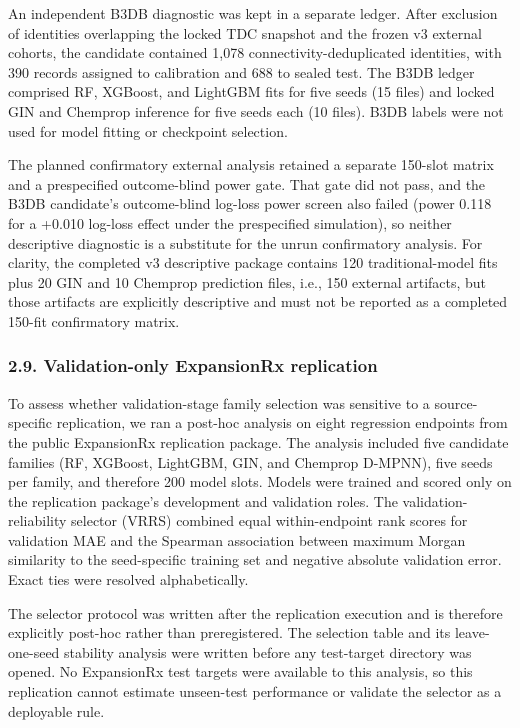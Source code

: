 \documentclass[
]{article}
\begin{document}
An independent B3DB diagnostic was kept in a separate ledger. After exclusion
of identities overlapping the locked TDC snapshot and the frozen v3 external
cohorts, the candidate contained 1,078 connectivity-deduplicated identities,
with 390 records assigned to calibration and 688 to sealed test. The B3DB
ledger comprised RF, XGBoost, and LightGBM fits for five seeds (15 files) and
locked GIN and Chemprop inference for five seeds each (10 files). B3DB labels
were not used for model fitting or checkpoint selection.

The planned confirmatory external analysis retained a separate 150-slot
matrix and a prespecified outcome-blind power gate. That gate did not pass,
and the B3DB candidate's outcome-blind log-loss power screen also failed
(power 0.118 for a +0.010 log-loss effect under the prespecified simulation),
so neither descriptive diagnostic is a substitute for the unrun confirmatory
analysis. For clarity, the completed v3 descriptive package contains 120
traditional-model fits plus 20 GIN and 10 Chemprop prediction files, i.e.,
150 external artifacts, but those artifacts are explicitly descriptive and
must not be reported as a completed 150-fit confirmatory matrix.

\subsubsection{2.9. Validation-only ExpansionRx replication}\label{validation-only-expansionrx-replication}

To assess whether validation-stage family selection was sensitive to a
source-specific replication, we ran a post-hoc analysis on eight regression
endpoints from the public ExpansionRx replication package. The analysis
included five candidate families (RF, XGBoost, LightGBM, GIN, and Chemprop
D-MPNN), five seeds per family, and therefore 200 model slots. Models were
trained and scored only on the replication package's development and
validation roles. The validation-reliability selector (VRRS) combined equal
within-endpoint rank scores for validation MAE and the Spearman association
between maximum Morgan similarity to the seed-specific training set and
negative absolute validation error. Exact ties were resolved alphabetically.

The selector protocol was written after the replication execution and is
therefore explicitly post-hoc rather than preregistered. The selection table
and its leave-one-seed stability analysis were written before any test-target
directory was opened. No ExpansionRx test targets were available to this
analysis, so this replication cannot estimate unseen-test performance or
validate the selector as a deployable rule.
\end{document}
